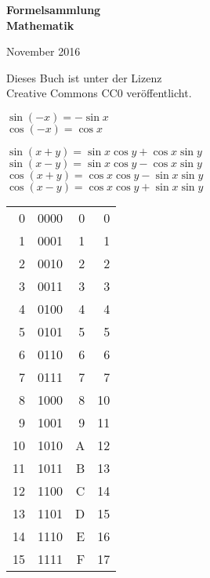 \documentclass[a4paper,10pt,fleqn,twocolumn,twoside,openany]{book}
\numberwithin{equation}{chapter}
\newenvironment{ttsection}{\ttfamily}{\par}
\begin{document}
\begin{titlepage}
\centering
\phantom{x}

\vspace{20em}
{\noindent\Huge\textbf{Formelsammlung\\
Mathematik}}

\vspace{2em}
{\Large November 2016}\\
\end{titlepage}

\thispagestyle{empty}

\noindent
Dieses Buch ist unter der Lizenz\\
Creative Commons CC0 veröffentlicht.
\vspace{8em}

\noindent
$\sin(-x) = -\sin x$\\
$\cos(-x) = \cos x$
\vspace{1em}

\noindent
$\sin(x+y) = \sin x\cos y + \cos x\sin y$\\
$\sin(x-y) = \sin x\cos y - \cos x\sin y$\\
$\cos(x+y) = \cos x\cos y - \sin x\sin y$\\
$\cos(x-y) = \cos x\cos y + \sin x\sin y$
\vspace{2em}

\noindent
\begin{ttsection}
\begin{tabular}{r|r|r|r}
 0 & 0000 & 0 &  0\\
 1 & 0001 & 1 &  1\\
 2 & 0010 & 2 &  2\\
 3 & 0011 & 3 &  3\\
\noalign{\vspace{1em}}
 4 & 0100 & 4 &  4\\
 5 & 0101 & 5 &  5\\
 6 & 0110 & 6 &  6\\
 7 & 0111 & 7 &  7\\
\noalign{\vspace{1em}}
 8 & 1000 & 8 & 10\\
 9 & 1001 & 9 & 11\\
10 & 1010 & A & 12\\
11 & 1011 & B & 13\\
\noalign{\vspace{1em}}
12 & 1100 & C & 14\\
13 & 1101 & D & 15\\
14 & 1110 & E & 16\\
15 & 1111 & F & 17
\end{tabular}
\end{ttsection}
\end{document}
